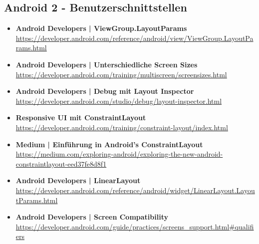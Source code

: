 \documentclass[a4paper]{article}
\begin{document}
	\subsection{Android 2 - Benutzerschnittstellen}
	
	\begin{itemize}
		\item \textbf{Android Developers | ViewGroup.LayoutParams}\\
		\href{https://developer.android.com/reference/android/view/ViewGroup.LayoutParams.html}
		{https://developer.android.com/reference/android/view/ViewGroup.LayoutParams.html}
		
		\item \textbf{Android Developers | Unterschiedliche Screen Sizes}\\
		\href{https://developer.android.com/training/multiscreen/screensizes.html}
		{https://developer.android.com/training/multiscreen/screensizes.html}
		
		\item \textbf{Android Developers | Debug mit Layout Inspector}\\
		\href{https://developer.android.com/studio/debug/layout-inspector.html}
		{https://developer.android.com/studio/debug/layout-inspector.html}
		
		\item \textbf{Responsive UI mit ConstraintLayout}\\
		\href{https://developer.android.com/training/constraint-layout/index.html}
		{https://developer.android.com/training/constraint-layout/index.html}
		
		\item \textbf{Medium | Einführung in Android's ConstraintLayout}\\
		\href{https://medium.com/exploring-android/exploring-the-new-android-constraintlayout-eed37fe8d8f1}
		{https://medium.com/exploring-android/exploring-the-new-android-constraintlayout-eed37fe8d8f1}
		
		\item \textbf{Android Developers | LinearLayout}\\
		\href{https://developer.android.com/reference/android/widget/LinearLayout.LayoutParams.html}
		{https://developer.android.com/reference/android/widget/LinearLayout.LayoutParams.html}
		
		\item \textbf{Android Developers | Screen Compatibility}\\
		\href{https://developer.android.com/guide/practices/screens_support.html#qualifiers}
		{https://developer.android.com/guide/practices/screens\_support.html\#qualifiers}
		

\end{itemize}
\end{document}
